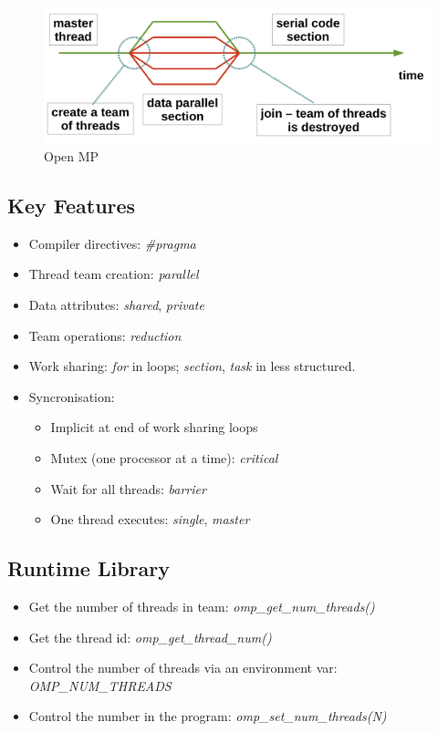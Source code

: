 \documentclass{article}
\begin{document}
\begin{figure}[h]
    \centering
    \includegraphics[scale=0.2]{images/openmp.png}
    \caption{Open MP}
    \label{fig:my_label}
\end{figure}

\subsection{Key Features}

\begin{itemize}
    \item Compiler directives: \textit{\#pragma}
    \item Thread team creation: \textit{parallel}
    \item Data attributes: \textit{shared}, \textit{private}
    \item Team operations: \textit{reduction}
    \item Work sharing: \textit{for} in loops; \textit{section}, \textit{task} in less structured.
    \item Syncronisation:
    \begin{itemize}
        \item Implicit at end of work sharing loops
        \item Mutex (one processor at a time): \textit{critical}
        \item Wait for all threads: \textit{barrier}
        \item One thread executes: \textit{single}, \textit{master}
    \end{itemize}
\end{itemize}

\subsection{Runtime Library}

\begin{itemize}
    \item Get the number of threads in team: \textit{omp\_get\_num\_threads()}
    \item Get the thread id: \textit{omp\_get\_thread\_num()}
    \item Control the number of threads via an environment var: \textit{OMP\_NUM\_THREADS}
    \item Control the number in the program: \textit{omp\_set\_num\_threads(N)}
\end{itemize}
\end{document}
